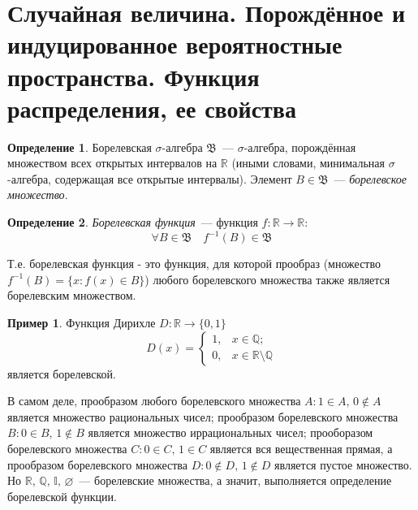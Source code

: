 \documentclass[oneside,final,14pt]{extreport}
\theoremstyle{plain}
\theoremstyle{definition}
\newtheorem*{defn}{Определение}
\newtheorem*{exmp}{Пример}
\theoremstyle{named}
\begin{document}
\section{Случайная величина. Порождённое и индуцированное вероятностные пространства. Функция распределения, ее свойства}

\begin{defn}
    {\it $\text{Борелевская~} \sigma \text{-алгебра~} \mathfrak{B}$}~--- $\sigma \text{-алгебра}$, порождённая множеством всех открытых интервалов на $\mathbb{R}$ (иными словами, минимальная $\sigma$-алгебра, содержащая все открытые интервалы). Элемент $B \in \mathfrak{B}$~--- {\it борелевское множество}.
\end{defn}

\begin{defn}
    {\it Борелевская функция}~--- функция $f: \mathbb{R} \rightarrow \mathbb{R}$:
    \begin{equation*}
        \forall B \in \mathfrak{B} \quad f^{-1}(B) \in \mathfrak{B}
    \end{equation*}
    
    Т.е. борелевская функция - это функция, для которой прообраз (множество $f^{-1}(B) = \{x \colon f(x) \in B\}$) любого борелевского множества также является борелевским множеством.
\end{defn}

\begin{exmp}
    Функция Дирихле $D: \mathbb{R} \rightarrow \{0,1\}$
    \begin{equation*}
        D(x) =
        \begin{cases}
            1, & x \in \mathbb{Q}; \\
            0, & x \in \mathbb{R} \setminus \mathbb{Q}
        \end{cases}
    \end{equation*}
является борелевской. 

В самом деле, прообразом любого борелевского множества ${A \colon 1 \in A, \, 0 \notin A}$ является множество рациональных чисел; прообразом борелевского множества ${B \colon 0 \in B, \, 1 \notin B}$ является множество иррациональных чисел; прооборазом борелевского множества ${C \colon 0 \in C, \, 1 \in C}$ является вся вещественная прямая, а прообразом борелевского множества ${D \colon 0 \notin D, \, 1 \notin D}$ является пустое множество. Но $\mathbb{R}, \, \mathbb{Q}, \, \mathbb{I}, \, \varnothing $~--- борелевские множества, а значит, выполняется определение борелевской функции.
\end{exmp}
\end{document}
